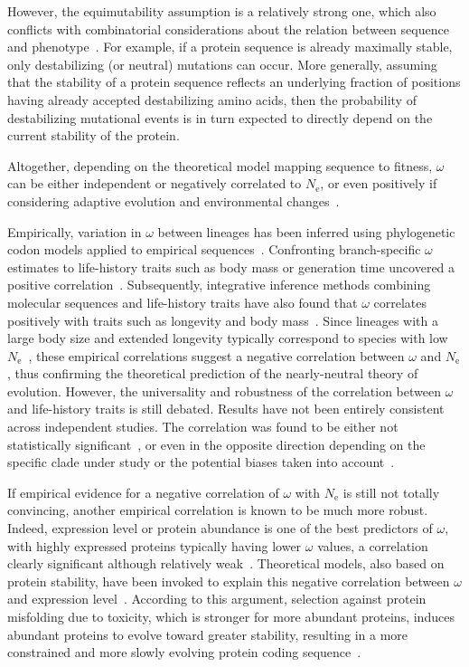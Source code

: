 \documentclass[authoryear]{elsarticle} %
\newcommand{\Ne}{N_{\text{e}}} %
\begin{document}
However, the equimutability assumption is a relatively strong one, which also conflicts with combinatorial considerations about the relation between sequence and phenotype~\citep{Serohijos2012}.
For example, if a protein sequence is already maximally stable, only destabilizing (or neutral) mutations can occur.
More generally, assuming that the stability of a protein sequence reflects an underlying fraction of positions having already accepted destabilizing amino acids, then the probability of destabilizing mutational events is in turn expected to directly depend on the current stability of the protein.

Altogether, depending on the theoretical model mapping sequence to fitness, $\omega$ can be either independent or negatively correlated to $\Ne$, or even positively if considering adaptive evolution and environmental changes~\citep{Lanfear2014}.

Empirically, variation in $\omega$ between lineages has been inferred using phylogenetic {codon} models applied to empirical sequences~\citep{Yang1998,Zhang2004}.
Confronting branch-specific $\omega$ estimates to life-history traits such as body mass or generation time uncovered a positive correlation~\citep{Popadin2007, Nikolaev2007}.
Subsequently, integrative inference methods combining molecular sequences and life-history traits have also found that $\omega$ correlates positively with traits such as longevity and body mass~\citep{Lartillot2011, Figuet2017}.
Since lineages with a large body size and extended longevity typically correspond to species with low $\Ne$~\citep{Romiguier2014}, these empirical correlations suggest a negative correlation between $\omega$ and $\Ne$, thus confirming the theoretical prediction of the {nearly-neutral} theory of evolution.
However, the universality and robustness of the correlation between $\omega$ and life-history traits is still debated.
Results have not been entirely consistent across independent studies. The correlation was found to be either not statistically significant~\citep{Lartillot2012}, or even in the opposite direction depending on the specific clade under study or the potential biases taken into account~\citep{Lanfear2010, Nabholz2013, Lanfear2014, Figuet2016}.

If empirical evidence for a negative correlation of $\omega$ with $\Ne$ is still not totally convincing, another empirical correlation is known to be much more robust.
Indeed, expression level or protein abundance is one of the best predictors of $\omega$, with highly expressed proteins typically having lower $\omega$ values, a correlation clearly significant although relatively weak~\citep{Duret2000, Rocha2004, Drummond2005a, Zhang2015, Song2017}.
Theoretical models, also based on protein stability, have been invoked to explain this negative correlation between $\omega$ and expression level~\citep{Wilke2006, Drummond2008}.
According to this argument, selection against protein misfolding due to toxicity, which is stronger for more abundant proteins, induces abundant proteins to evolve toward greater stability, resulting in a more constrained and more slowly evolving protein coding sequence~\citep{Serohijos2012}.
\end{document}
